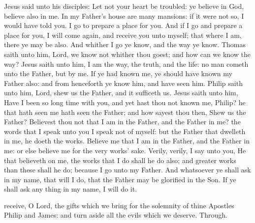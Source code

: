\clearpage
{}

 Jesus said unto his disciples: Let not your heart be troubled: ye believe in God, believe also in me. In my Father's house are many mansions: if it were not so, I would have told you. I go to prepare a place for you. And if I go and prepare a place for you, I will come again, and receive you unto myself; that where I am, there ye may be also. And whither I go ye know, and the way ye know. Thomas saith unto him, Lord, we know not whither thou goest; and how can we know the way? Jesus saith unto him, I am the way, the truth, and the life: no man cometh unto the Father, but by me. If ye had known me, ye should have known my Father also: and from henceforth ye know him, and have seen him. Philip saith unto him, Lord, shew us the Father, and it sufficeth us. Jesus saith unto him, Have I been so long time with you, and yet hast thou not known me, Philip? he that hath seen me hath seen the Father; and how sayest thou then, Shew us the Father? Believest thou not that I am in the Father, and the Father in me? the words that I speak unto you I speak not of myself: but the Father that dwelleth in me, he doeth the works. Believe me that I am in the Father, and the Father in me: or else believe me for the very works' sake. Verily, verily, I say unto you, He that believeth on me, the works that I do shall he do also; and greater works than these shall he do; because I go unto my Father. And whatsoever ye shall ask in my name, that will I do, that the Father may be glorified in the Son. If ye shall ask any thing in my name, I will do it.


\secret
{} receive, O Lord, the gifts which we bring for the solemnity of thine Apostles Philip and James: and turn aside all the evils which we deserve. Through.


